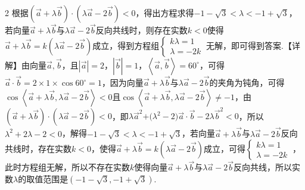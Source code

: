 \documentclass[fontset=none]{ctexart}
\newcommand{\heiti}{\CJKfamily{hei}}
\newcommand{\biaoqian}[1]{{\heiti #1}}
\begin{document}
\begin{multicols}{2}
\noindent\hangindent=7mm\hangafter=0\biaoqian{【分析】}根据\(\left( \overrightarrow{a} + \lambda\overrightarrow{b} \right) \cdot \allowbreak\left( \lambda\overrightarrow{a} - 2\overrightarrow{b} \right) < 0\)，得出方程求得\(- 1 - \sqrt{3} < \lambda < - 1 + \sqrt{3}\)，若向量\(\overrightarrow{a} + \lambda\overrightarrow{b}\)与\(\lambda\overrightarrow{a} - 2\overrightarrow{b}\)反向共线时，则存在实数\(k < 0\)使得\(\overrightarrow{a} + \lambda\overrightarrow{b} = k(\lambda\overrightarrow{a} - 2\overrightarrow{b})\)成立，得到方程组\(\left\{ \begin{array}{r}
k\lambda = 1 \\
\lambda = - 2k
\end{array} \right.\ \)无解，即可得到答案.\biaoqian{【详解】}由向量\(\overrightarrow{a},\overrightarrow{b}\)，且\(\left| \overrightarrow{a} \right| = 2\)，\(\left| \overrightarrow{b} \right| = 1\)，\(\left\langle \overrightarrow{a},\overrightarrow{b} \right\rangle = 60^{\circ}\)，可得\(\overrightarrow{a} \cdot \overrightarrow{b} = 2 \times 1 \times \cos 60^{\circ} = 1\)，因为向量\(\overrightarrow{a} + \lambda\overrightarrow{b}\)与\(\lambda\overrightarrow{a} - 2\overrightarrow{b}\)的夹角为钝角，可得\(\cos\left\langle \overrightarrow{a} + \lambda\overrightarrow{b},\lambda\overrightarrow{a} - 2\overrightarrow{b} \right\rangle < 0\)且\(\cos\left\langle \overrightarrow{a} + \lambda\overrightarrow{b},\lambda\overrightarrow{a} - 2\overrightarrow{b} \right\rangle \neq - 1\)，由\(\left( \overrightarrow{a} + \lambda\overrightarrow{b} \right) \cdot \allowbreak\left( \lambda\overrightarrow{a} - 2\overrightarrow{b} \right) < 0\)，即\(\lambda{\overrightarrow{a}}^{2}\text{+(}\lambda^{2} - 2)\overrightarrow{a} \cdot \overrightarrow{b} - 2\lambda{\overrightarrow{b}}^{2} < 0\)，所以\(\lambda^{2} + 2\lambda - 2 < 0\)，解得\(- 1 - \sqrt{3} < \lambda < - 1 + \sqrt{3}\)，若向量\(\overrightarrow{a} + \lambda\overrightarrow{b}\)与\(\lambda\overrightarrow{a} - 2\overrightarrow{b}\)反向共线时，存在实数\(k < 0\)，使得\(\overrightarrow{a} + \lambda\overrightarrow{b} = k(\lambda\overrightarrow{a} - 2\overrightarrow{b})\)成立，可得\(\left\{ \begin{array}{r}
k\lambda = 1 \\
\lambda = - 2k
\end{array} \right.\ \)，此时方程组无解，所以不存在实数\(k\)使得向量\(\overrightarrow{a} + \lambda\overrightarrow{b}\)与\(\lambda\overrightarrow{a} - 2\overrightarrow{b}\)反向共线，所以实数\(\lambda\)的取值范围是\(\left( - 1 - \sqrt{3}, - 1 + \sqrt{3} \right)\).\par


\end{multicols}
\end{document}
